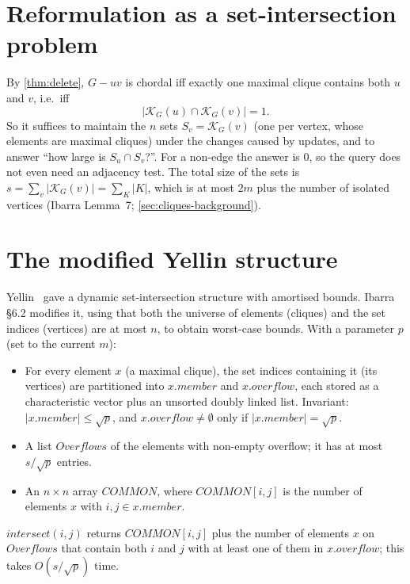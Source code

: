 \documentclass[11pt,a4paper,oneside]{report}
\theoremstyle{plain}
\theoremstyle{definition}
\theoremstyle{remark}
\newcommand{\KG}{\mathcal{K}_G}
\begin{document}
\section{Reformulation as a set-intersection problem}
By \cref{thm:delete}, \(G-uv\) is chordal iff exactly one maximal clique contains both \(u\)
and \(v\), i.e.\ iff
\[ |\KG(u)\cap\KG(v)| = 1 . \]
So it suffices to maintain the \(n\) sets \(S_v=\KG(v)\) (one per vertex, whose elements are
maximal cliques) under the changes caused by updates, and to answer ``how large is
\(S_u\cap S_v\)?''. For a non-edge the answer is 0, so the query does not even need an
adjacency test. The total size of the sets is \(s=\sum_v|\KG(v)|=\sum_K|K|\), which is at most
\(2m\) plus the number of isolated vertices (Ibarra Lemma~7; \cref{sec:cliques-background}).

\section{The modified Yellin structure}
Yellin~\cite{yellin1994} gave a dynamic set-intersection structure with amortised bounds.
Ibarra \S6.2 modifies it, using that both the universe of elements (cliques) and the set
indices (vertices) are at most \(n\), to obtain worst-case bounds. With a parameter \(p\) (set to
the current \(m\)):

\begin{paperbox}
\begin{itemize}
\item For every element \(x\) (a maximal clique), the set indices containing it (its vertices)
  are partitioned into \(x.\mathit{member}\) and \(x.\mathit{overflow}\), each stored as a
  characteristic vector plus an unsorted doubly linked list. Invariant:
  \(|x.\mathit{member}|\le\sqrt p\), and \(x.\mathit{overflow}\ne\emptyset\) only if
  \(|x.\mathit{member}|=\sqrt p\).
\item A list \(\mathit{Overflows}\) of the elements with non-empty overflow; it has at most
  \(s/\sqrt p\) entries.
\item An \(n\times n\) array \(\mathit{COMMON}\), where \(\mathit{COMMON}[i,j]\) is the number of
  elements \(x\) with \(i,j\in x.\mathit{member}\).
\end{itemize}
\(\mathit{intersect}(i,j)\) returns \(\mathit{COMMON}[i,j]\) plus the number of elements \(x\)
on \(\mathit{Overflows}\) that contain both \(i\) and \(j\) with at least one of them in
\(x.\mathit{overflow}\); this takes \(O(s/\sqrt p)\) time.
\end{paperbox}
\end{document}
